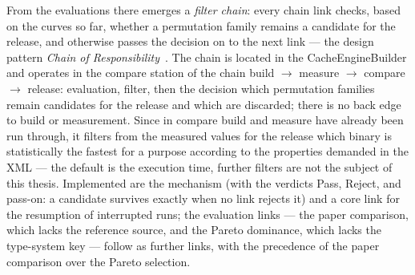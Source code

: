 \begin{nurlang}
From the evaluations there emerges a \emph{filter chain}: every chain link checks, based on the curves so far,
whether a permutation family remains a candidate for the release, and otherwise passes the decision on to the
next link --- the design pattern \emph{Chain of Responsibility}~\cite{gamma1994patterns}. The
chain is located in the CacheEngineBuilder and operates in the compare station of the chain build $\to$ measure
$\to$ compare $\to$ release: evaluation, filter, then the decision which permutation families
remain candidates for the release and which are discarded;
there is no back edge to build or measurement. Since in compare
build and measure have already been run through, it filters from the measured values for the release
which binary is statistically the fastest for a purpose according to the properties demanded in the XML
--- the default is the execution time, further filters are not the subject of this
thesis. Implemented are the mechanism (with the verdicts Pass, Reject, and pass-on: a
candidate survives exactly when no link rejects it) and a core link for the resumption of
interrupted runs; the evaluation links --- the paper comparison, which lacks the reference source, and
the Pareto dominance, which lacks the type-system key --- follow as further links, with the precedence
of the paper comparison over the Pareto selection.


\end{nurlang}
